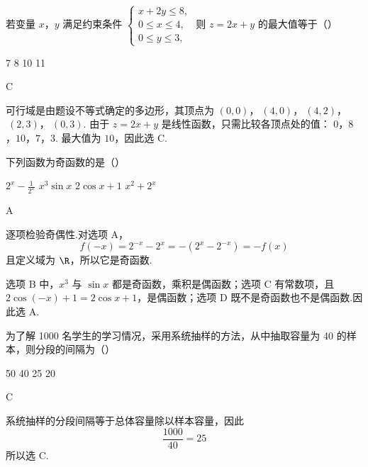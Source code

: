 \begin{problem}
若变量 \(x\)，\(y\) 满足约束条件 \(\begin{cases}
x + 2y \leqslant 8,\\
0 \leqslant x \leqslant 4,\\
0 \leqslant y \leqslant 3,
\end{cases}\) 则 \(z = 2x + y\) 的最大值等于（\quad）

\choices
    {7}
    {8}
    {10}
    {11}
\end{problem}

\begin{answer}
C
\end{answer}

\begin{solution}
可行域是由题设不等式确定的多边形，其顶点为
\((0,0)\)，\(\ (4,0)\)，\(\ (4,2)\)，\(\ (2,3)\)，\(\ (0,3)\).
由于 \(z=2x+y\) 是线性函数，只需比较各顶点处的值：
\(0\)，\(8\)，\(10\)，\(7\)，\(3\).
最大值为 \(10\)，因此选 C.
\end{solution}

\begin{problem}
下列函数为奇函数的是（\quad）

\choices
    {\(2^{x} - \frac{1}{2^{x}}\)}
    {\(x^{3}\sin x\)}
    {\(2\cos x + 1\)}
    {\(x^{2} + 2^{x}\)}
\end{problem}

\begin{answer}
A
\end{answer}

\begin{solution}
逐项检验奇偶性.对选项 A，
\[
f(-x)=2^{-x}-2^x=-(2^x-2^{-x})=-f(x)
\]
且定义域为 \(\R\)，所以它是奇函数.

选项 B 中，\(x^3\) 与 \(\sin x\) 都是奇函数，乘积是偶函数；选项 C 有常数项，且
\(2\cos(-x)+1=2\cos x+1\)，是偶函数；选项 D 既不是奇函数也不是偶函数.因此选 A.
\end{solution}

\begin{problem}
为了解 1000 名学生的学习情况，采用系统抽样的方法，从中抽取容量为 40 的样本，则分段的间隔为（\quad）

\choices
    {50}
    {40}
    {25}
    {20}
\end{problem}

\begin{answer}
C
\end{answer}

\begin{solution}
系统抽样的分段间隔等于总体容量除以样本容量，因此
\[
\frac{1000}{40}=25
\]
所以选 C.
\end{solution}


